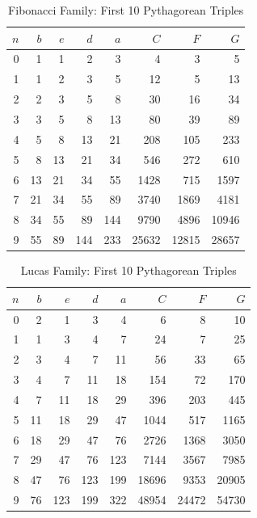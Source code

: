 \begin{table}[h!]
\centering
\caption{Fibonacci Family: First 10 Pythagorean Triples}
\label{tab:fibonacci}
\small
\begin{tabular}{rrrrrrrr}
\toprule
$n$ & $b$ & $e$ & $d$ & $a$ & $C$ & $F$ & $G$ \\
\midrule
0 & 1 & 1 & 2 & 3 & 4 & 3 & 5 \\
1 & 1 & 2 & 3 & 5 & 12 & 5 & 13 \\
2 & 2 & 3 & 5 & 8 & 30 & 16 & 34 \\
3 & 3 & 5 & 8 & 13 & 80 & 39 & 89 \\
4 & 5 & 8 & 13 & 21 & 208 & 105 & 233 \\
5 & 8 & 13 & 21 & 34 & 546 & 272 & 610 \\
6 & 13 & 21 & 34 & 55 & 1428 & 715 & 1597 \\
7 & 21 & 34 & 55 & 89 & 3740 & 1869 & 4181 \\
8 & 34 & 55 & 89 & 144 & 9790 & 4896 & 10946 \\
9 & 55 & 89 & 144 & 233 & 25632 & 12815 & 28657 \\
\bottomrule
\end{tabular}
\end{table}


\begin{table}[h!]
\centering
\caption{Lucas Family: First 10 Pythagorean Triples}
\label{tab:lucas}
\small
\begin{tabular}{rrrrrrrr}
\toprule
$n$ & $b$ & $e$ & $d$ & $a$ & $C$ & $F$ & $G$ \\
\midrule
0 & 2 & 1 & 3 & 4 & 6 & 8 & 10 \\
1 & 1 & 3 & 4 & 7 & 24 & 7 & 25 \\
2 & 3 & 4 & 7 & 11 & 56 & 33 & 65 \\
3 & 4 & 7 & 11 & 18 & 154 & 72 & 170 \\
4 & 7 & 11 & 18 & 29 & 396 & 203 & 445 \\
5 & 11 & 18 & 29 & 47 & 1044 & 517 & 1165 \\
6 & 18 & 29 & 47 & 76 & 2726 & 1368 & 3050 \\
7 & 29 & 47 & 76 & 123 & 7144 & 3567 & 7985 \\
8 & 47 & 76 & 123 & 199 & 18696 & 9353 & 20905 \\
9 & 76 & 123 & 199 & 322 & 48954 & 24472 & 54730 \\
\bottomrule
\end{tabular}
\end{table}


